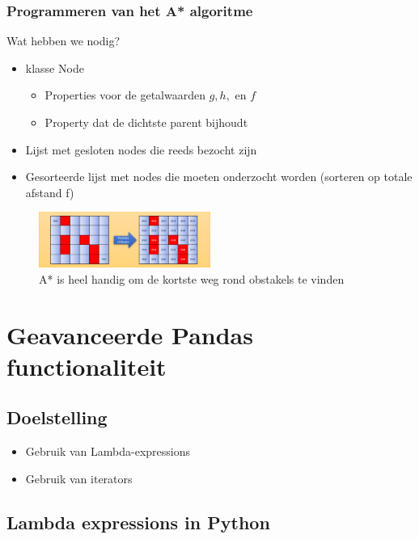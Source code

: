 \documentclass{article}
\begin{document}
\subsubsection{Programmeren van het A* algoritme}

Wat hebben we nodig?

\begin{itemize}
    \item klasse Node 
    \begin{itemize}
        \item Properties voor de getalwaarden $g, h,$ en $f$
        \item Property dat de dichtste parent bijhoudt
    \end{itemize}
    \item Lijst met gesloten nodes die reeds bezocht zijn
    \item Gesorteerde lijst met nodes die moeten onderzocht worden (sorteren op totale afstand f)
\end{itemize}

\begin{figure}[H]
    \centering
    \includegraphics[width=0.5\textwidth]{a-star-doolhof.png}
    \caption{A* is heel handig om de kortste weg rond obstakels te vinden}
\end{figure}

\section{Geavanceerde Pandas functionaliteit}

\subsection{Doelstelling}

\begin{itemize}
    \item Gebruik van Lambda-expressions
    \item Gebruik van iterators
\end{itemize}

\subsection{Lambda expressions in Python}
\end{document}
